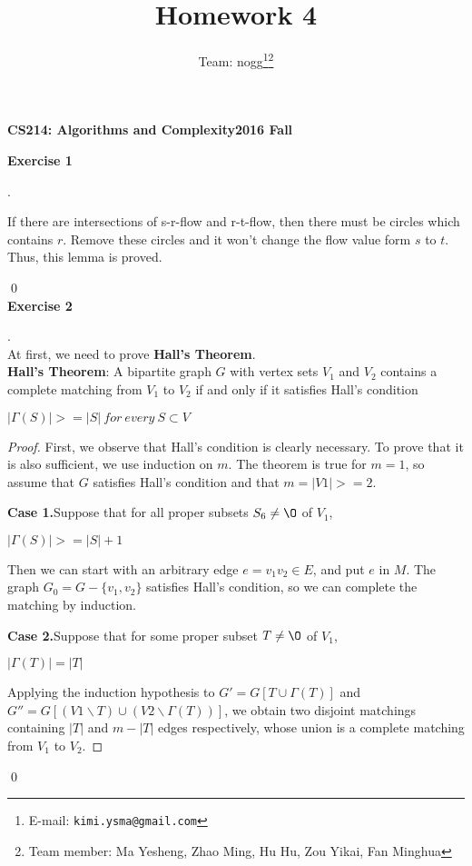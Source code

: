 \documentclass[12pt, notitlepage]{article}
\title{Homework 4}
\author{Team: nogg\footnote{E-mail: \texttt{kimi.ysma@gmail.com}}\footnote{Team member: Ma Yesheng, Zhao Ming, Hu Hu, Zou Yikai, Fan Minghua}}
\newenvironment{sol}
  {\par\vspace{3mm}\noindent{\it Solution}.}{\qed}
\begin{document}
{\bf\small CS214: Algorithms and Complexity}\hfill{\bf\small 2016 Fall}
{\let\newpage\relax\maketitle}

\textbf{Exercise 1}
\begin{sol}
	
\qquad If there are intersections of s-r-flow and r-t-flow, then there must be circles which contains $r$. Remove these circles and it won't change the flow value form $s$ to $t$. Thus, this lemma is proved. 

\end{sol}\\

\textbf{Exercise 2}
\begin{sol}\\
At first, we need to prove \textbf{Hall's Theorem}.\\
\textbf{Hall's Theorem}: A bipartite graph $G$ with vertex sets $V_1$ and $V_2$ contains a complete matching
from $V_1$ to $V_2$ if and only if it satisfies Hall's condition\\
\centerline{$|\Gamma (S)| >= |S|\ for\ every\ S \subset V$}
\begin{proof}
First, we observe that Hall’s condition is clearly necessary. To prove that it is also sufficient, we use induction on $m$. The theorem is true for $m = 1$, so assume that $G$ satisfies Hall’s condition and that $m = |V1| >= 2$.

\qquad \textbf{Case 1.}Suppose that for all proper subsets $S _6 \neq \O$ of $V_1$,\\
\centerline{$|\Gamma(S)| >= |S| + 1$}
Then we can start with an arbitrary edge $e = v_1v_2 \in E$, and put $e$ in $M$. The graph $G_0 = G- \{v_1, v_2\}$ satisfies Hall’s condition, so we can complete the matching by induction.

\qquad \textbf{Case 2.}Suppose that for some proper subset $T \neq \O$ of $V_1$,\\
\centerline{$|\Gamma (T)| = |T|$}
Applying the induction hypothesis to $G' = G[T \cup \Gamma (T)]$ and $G'' = G[(V1 \backslash T) \cup (V2 \backslash \Gamma (T))]$, we obtain two disjoint matchings containing $|T|$ and $m-|T|$ edges respectively, whose union is a complete matching from $V_1$ to $V_2$.
\end{proof}


\end{sol}
\end{document}
